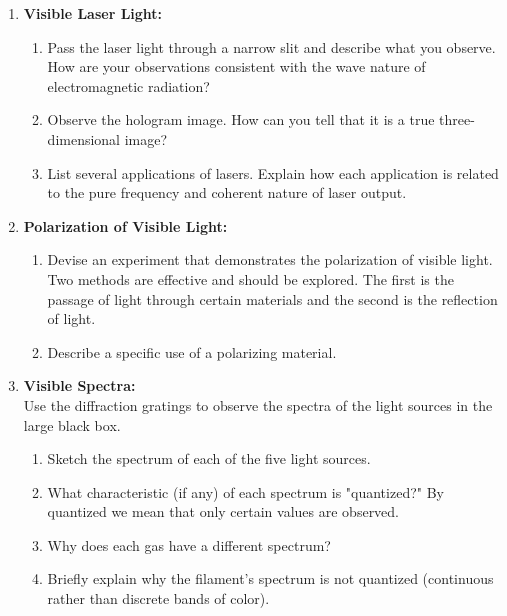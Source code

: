 \begin{enumerate}
	\item \textbf{Visible Laser Light:} 
	
	\begin{enumerate}
		\item Pass the laser light through a narrow slit and describe what you observe.  How are your observations consistent with the wave nature of electromagnetic radiation?
		\item Observe the hologram image.  How can you tell that it is a true three-dimensional image?
		\item List several applications of lasers.  Explain how each application is related to the pure frequency and coherent nature of laser output.
	\end{enumerate}
	\clearpage
	\item \textbf{Polarization of Visible Light:}
	\begin{enumerate}
		\item Devise an experiment that demonstrates the polarization of visible light. Two methods are effective and should be explored. The first is the passage of light through certain materials and the second is the reflection of light.
		\item Describe a specific use of a polarizing material.
	\end{enumerate}
	
	\item \textbf{Visible Spectra:} \\	
		Use the diffraction gratings to observe the spectra of the light sources in the large black box.
	\begin{enumerate}	
		\item Sketch the spectrum of each of the five light sources.
		\item What characteristic (if any) of each spectrum is "quantized?"  By quantized we mean that only certain values are observed.
		\item Why does each gas have a different spectrum?
		\item Briefly explain why the filament's spectrum is not quantized (continuous rather than discrete bands of color).
	\end{enumerate}
\end{enumerate}

